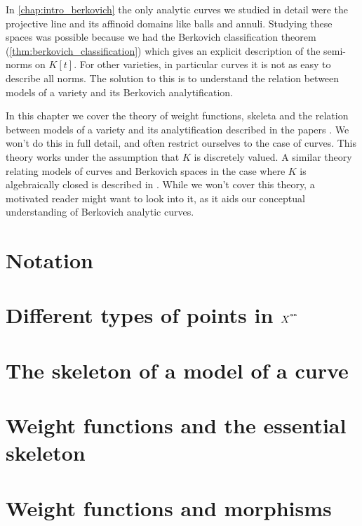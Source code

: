 In \cref{chap:intro_berkovich} the only analytic curves we studied in detail were the projective line and its affinoid domains like balls and annuli.
Studying these spaces was possible because we had the Berkovich classification  theorem (\cref{thm:berkovich_classification}) which gives an explicit description of the semi-norms on $K[t]$. 
For other varieties, in particular curves it is not as easy to describe all norms.
The solution to this is to understand the relation between models of a variety and its Berkovich analytification. 


In this chapter we cover the theory of weight functions, skeleta and the relation between models of a variety and its analytification described in the papers \cite{mustataWeightFunctionsNonArchimedean2015, nicaiseBerkovichSkeletaBirational2016, bakerWeightFunctionsBerkovich2016}.
We won't do this in full detail, and often restrict ourselves to the case of curves.
This theory works under the assumption that $K$ is discretely valued. 
A similar theory relating models of curves and Berkovich spaces in the case where $K$ is algebraically closed is described in \cite{bakerStructureNonarchimedeanAnalytic2013}. 
While we won't cover this theory, a motivated reader might want to look into it, as it aids our conceptual understanding of Berkovich analytic curves.  



\section{Notation} \label{sec:notation}


\section{Different types of points in $X^{{}^{\text{an}}}$} \label{sec:different_types_of_points_in_xan}


\section{The skeleton of a model of a curve} \label{sec:skeleton_skeleton_of_a_model_of_a_curve}



\section{Weight functions and the essential skeleton} \label{sec:weight_functions_essential_skeleton}


\section{Weight functions and morphisms} \label{sec:weight_functions_and_morphisms}



